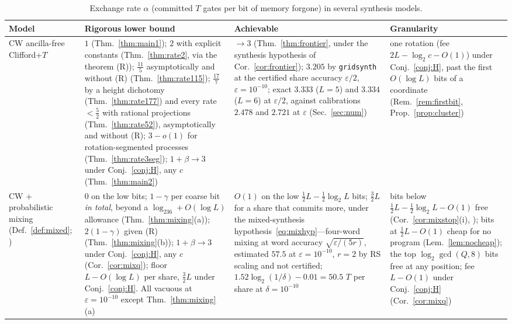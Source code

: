 \documentclass[aps,prx,twocolumn,superscriptaddress,nofootinbib,longbibliography]{revtex4-2}
\theoremstyle{plain}
\theoremstyle{definition}
\theoremstyle{remark}
\begin{document}
\begin{table}[t]
\centering\small
\caption{Exchange rate $\alpha$ (committed $T$ gates per bit of memory forgone) in several synthesis models.}
\label{tab:models}
\begin{tabular}{@{}p{3.6cm} p{5.2cm} p{4.6cm} p{3.4cm}@{}}
\toprule
\raggedright Model & \raggedright Rigorous lower bound & \raggedright Achievable & \raggedright Granularity\tabularnewline
\midrule
\raggedright CW ancilla-free Clifford+$T$ & \raggedright $1$ (Thm.~\ref{thm:main1}); $2$ with explicit constants (Thm.~\ref{thm:rate2}, via the theorem (R)); $\tfrac{11}5$ asymptotically and without (R) (Thm.~\ref{thm:rate115}); $\tfrac{17}7$ by a height dichotomy (Thm.~\ref{thm:rate177}) and every rate $<\tfrac52$ with rational projections (Thm.~\ref{thm:rate52}), asymptotically and without (R); $3-o(1)$ for rotation-segmented processes (Thm.~\ref{thm:rate3seg}); $1+\beta\to3$ under Conj.~\ref{conj:H}, any $c$ (Thm.~\ref{thm:main2}) & \raggedright $\to3$ (Thm.~\ref{thm:frontier}, under the synthesis hypothesis of Cor.~\ref{cor:frontier}); $3.205$ by \texttt{gridsynth} at the certified share accuracy $\varepsilon/2$, $\varepsilon=10^{-10}$; exact $3.333$ ($L=5$) and $3.334$ ($L=6$) at $\varepsilon/2$, against calibrations $2.478$ and $2.721$ at $\varepsilon$ (Sec.~\ref{sec:num}) & \raggedright one rotation (fee $2L-\log_2c-O(1)$) under Conj.~\ref{conj:H}, past the first $O(\log L)$ bits of a coordinate (Rem.~\ref{rem:firstbit}, Prop.~\ref{prop:cluster})\tabularnewline
\raggedright CW $+$ probabilistic mixing (Def.~\ref{def:mixed}; \cite{Campbell17,Hastings17,KLMPP,Bothe}) & \raggedright $0$ on the low bits; $1-\gamma$ per coarse bit \emph{in total}, beyond a $\log_236+O(\log L)$ allowance (Thm.~\ref{thm:mixing}(a)); $2(1-\gamma)$ given (R) (Thm.~\ref{thm:mixing}(b)); $1+\beta\to3$ under Conj.~\ref{conj:H}, any $c$ (Cor.~\ref{cor:mixq}); floor $L-O(\log L)$ per share, $\tfrac32L$ under Conj.~\ref{conj:H}. All vacuous at $\varepsilon=10^{-10}$ except Thm.~\ref{thm:mixing}(a) & \raggedright $O(1)$ on the low $\tfrac12L-\tfrac12\log_2L$ bits; $\tfrac32L$ for a share that commits more, under the mixed-synthesis hypothesis~\eqref{eq:mixhyp}---four-word mixing \cite[Thm.~2]{Campbell17} at word accuracy $\sqrt{\varepsilon/(5r)}$, estimated $57.5$ at $\varepsilon=10^{-10}$, $r=2$ by RS scaling and not certified; $1.52\log_2(1/\delta)-0.01=50.5$ $T$ per share at $\delta=10^{-10}$ \cite{KLMPP,Bothe} & \raggedright bits below $\tfrac12L-\tfrac12\log_2L-O(1)$ free (Cor.~\ref{cor:mixstop}(i), \cite{Bothe}); bits at $\tfrac12L-O(1)$ cheap for no program (Lem.~\ref{lem:nocheap}); the top $\log_2\gcd(Q,8)$ bits free at any position; fee $L-O(1)$ under Conj.~\ref{conj:H} (Cor.~\ref{cor:mixq})\tabularnewline

\end{tabular}
\end{table}
\end{document}
